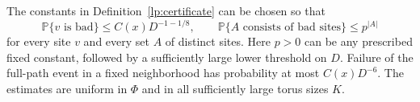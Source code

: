 \begin{proposition}\label{lp:good-probability}
The constants in Definition~\ref{lp:certificate} can be chosen so that
\begin{equation}\label{lp:good-probability-bounds}
 \mathbb P\{v\text{ is bad}\}\leq C(x)D^{-1-1/8},
 \qquad
 \mathbb P\{A\text{ consists of bad sites}\}\leq p^{|A|}
\end{equation}
for every site $v$ and every set $A$ of distinct sites.  Here $p>0$
can be any prescribed fixed constant, followed by a sufficiently large
lower threshold on $D$.  Failure of the full-path event in a fixed
neighborhood has probability at most $C(x)D^{-6}$.  The estimates are
uniform in $\Phi$ and in all sufficiently large torus sizes $K$.
\end{proposition}

